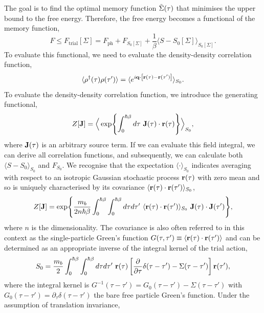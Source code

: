 The goal is to find the optimal memory function $\Tilde{\Sigma}(\tau)$ that minimises the upper bound to the free energy. Therefore, the free energy becomes a functional of the memory function,
\begin{equation}
    F \leq F_{\text{trial}} \left[ \Sigma \right] = F_{\text{ph}} + F_{S_0[\Sigma]} + \frac{1}{\beta} \langle S - S_0[\Sigma] \rangle_{S_0[\Sigma]}.
\end{equation}
To evaluate this functional, we need to evaluate the density-density correlation function,
\begin{equation}
    \langle \rho^{\dagger}(\tau) \rho(\tau') \rangle = \langle e^{i \vb{q} \cdot \left[ \vb{r}(\tau) - \vb{r}(\tau') \right]} \rangle_{S_0} .
\end{equation}
To evaluate the density-density correlation function, we introduce the generating functional,
\begin{equation}
    Z[\vb{J}] = \Big\langle \exp{\int_0^{\hbar\beta} d\tau\ \vb{J}(\tau) \cdot \vb{r}(\tau) } \Big\rangle_{S_0},
\end{equation}
where $\vb{J}(\tau)$ is an arbitrary source term. If we can evaluate this field integral, we can derive all correlation functions, and subsequently, we can calculate both $\langle S - S_0 \rangle_{S_0}$ and $F_{S_0}$. We recognise that the expectation $\langle \cdot \rangle_{S_0}$ indicates averaging with respect to an isotropic Gaussian stochastic process $\vb{r}(\tau)$ with zero mean and so is uniquely characterised by its covariance $\langle \vb{r}(\tau) \cdot \vb{r}(\tau') \rangle_{S_0}$,
\begin{equation}
    Z[\vb{J}] = \exp{\frac{m_b}{2n \hbar \beta} \int_0^{\hbar\beta} \int_0^{\hbar\beta} d\tau d\tau'\ \langle \vb{r}(\tau) \cdot \vb{r}(\tau') \rangle_{S_0}\ \vb{J}(\tau) \cdot \vb{J}(\tau')},
\end{equation}
where $n$ is the dimensionality. The covariance is also often referred to in this context as the single-particle Green's function $G(\tau, \tau') \equiv \langle \vb{r}(\tau) \cdot \vb{r}(\tau') \rangle$ and can be determined as an appropriate inverse of the integral kernel of the trial action,
\begin{equation}
    S_0 = \frac{m_b}{2}\int_0^{\hbar\beta} \int_0^{\hbar\beta} d\tau d\tau'\ \vb{r}(\tau) \left[ \frac{\partial}{\partial \tau} \delta(\tau - \tau') - \Sigma(\tau - \tau') \right] \vb{r}(\tau'),
\end{equation}
where the integral kernel is $G^{-1}(\tau - \tau') = G_0(\tau - \tau') - \Sigma(\tau - \tau')$ with $G_0(\tau - \tau') = \partial_{\tau}\delta(\tau - \tau')$ the bare free particle Green's function. Under the assumption of translation invariance,
